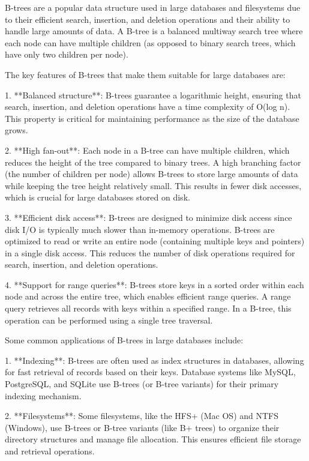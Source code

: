\documentclass{article}
\begin{document}
B-trees are a popular data structure used in large databases and filesystems due to their efficient search, insertion, and deletion operations and their ability to handle large amounts of data. A B-tree is a balanced multiway search tree where each node can have multiple children (as opposed to binary search trees, which have only two children per node).

The key features of B-trees that make them suitable for large databases are:

1. **Balanced structure**: B-trees guarantee a logarithmic height, ensuring that search, insertion, and deletion operations have a time complexity of O(log n). This property is critical for maintaining performance as the size of the database grows.

2. **High fan-out**: Each node in a B-tree can have multiple children, which reduces the height of the tree compared to binary trees. A high branching factor (the number of children per node) allows B-trees to store large amounts of data while keeping the tree height relatively small. This results in fewer disk accesses, which is crucial for large databases stored on disk.

3. **Efficient disk access**: B-trees are designed to minimize disk access since disk I/O is typically much slower than in-memory operations. B-trees are optimized to read or write an entire node (containing multiple keys and pointers) in a single disk access. This reduces the number of disk operations required for search, insertion, and deletion operations.

4. **Support for range queries**: B-trees store keys in a sorted order within each node and across the entire tree, which enables efficient range queries. A range query retrieves all records with keys within a specified range. In a B-tree, this operation can be performed using a single tree traversal.

Some common applications of B-trees in large databases include:

1. **Indexing**: B-trees are often used as index structures in databases, allowing for fast retrieval of records based on their keys. Database systems like MySQL, PostgreSQL, and SQLite use B-trees (or B-tree variants) for their primary indexing mechanism.

2. **Filesystems**: Some filesystems, like the HFS+ (Mac OS) and NTFS (Windows), use B-trees or B-tree variants (like B+ trees) to organize their directory structures and manage file allocation. This ensures efficient file storage and retrieval operations.
\end{document}
